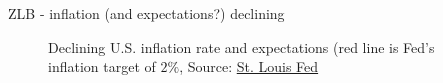 \begin{frame}{ZLB - inflation (and expectations?) declining}

\begin{figure}
\begin{center}


\end{center}
\caption{Declining U.S. inflation rate and expectations (red line is Fed's inflation target of $2\%$, Source: \href{https://www.stlouisfed.org/publications/regional-economist/first-quarter-2018/why-inflation-so-low}{St. Louis Fed}}
\end{figure}

\end{frame}


	
